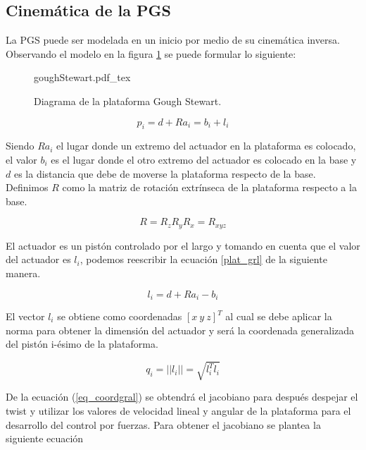 \subsection{Cinemática de la PGS}
\label{section: kinematics}

La PGS puede ser modelada en un inicio por medio de su 
cinemática inversa. Observando el modelo en la figura 
\ref{fig: gough stewart diagram} se puede formular lo 
siguiente:

 \begin{figure}[ht]
    \centering
    {goughStewart.pdf_tex}
    \caption{Diagrama de la plataforma Gough Stewart.}
    \label{fig: gough stewart diagram}
\end{figure}

\begin{equation} \label{plat_grl}
p_i = d + Ra_i = b_i + l_i
\end{equation}

Siendo $Ra_i$ el lugar donde un extremo del actuador en la 
plataforma es colocado, el valor $b_i$ es el lugar donde el 
otro extremo del actuador es colocado en la base y $d$ es la 
distancia que debe de moverse la plataforma respecto de la 
base. Definimos $R$ como la matriz de rotación extrínseca de 
la plataforma respecto a la base. 

\begin{equation}
R = R_zR_yR_x = R_{xyz}
\end{equation}

El actuador es un pistón controlado por el largo y tomando 
en cuenta que el valor del actuador es $l_i$, podemos 
reescribir la ecuación \ref{plat_grl} de la siguiente 
manera.

\begin{equation}
l_i = d + Ra_i - b_i
\end{equation}

El vector $l_i$ se obtiene como coordenadas $[x\ y\ z]^T$ al 
cual se debe aplicar la norma para obtener la dimensión del 
actuador y será la coordenada generalizada del pistón 
i-ésimo de la plataforma.

\begin{equation}\label{eq_coordgral}
q_i = ||l_i|| = \sqrt{l_i^Tl_i}
\end{equation}

De la ecuación (\ref{eq_coordgral}) se obtendrá el jacobiano 
para después despejar el twist y utilizar los valores de 
velocidad lineal y angular de la plataforma para el 
desarrollo del control por fuerzas. Para obtener el 
jacobiano se plantea la siguiente ecuación

